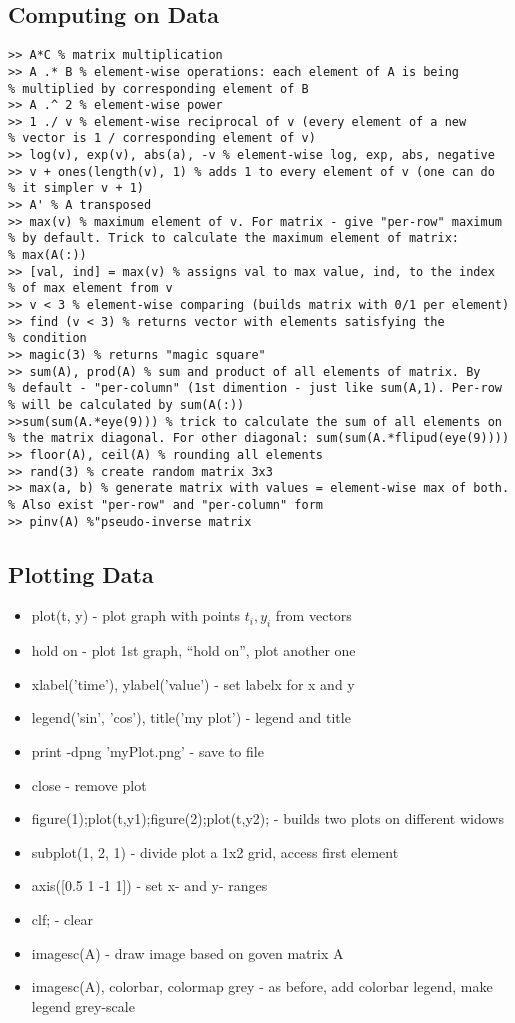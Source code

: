 \documentclass{scrartcl}
\begin{document}
\subsection{Computing on Data}
\label{5-3}
\begin{verbatim}
>> A*C % matrix multiplication
>> A .* B % element-wise operations: each element of A is being
% multiplied by corresponding element of B
>> A .^ 2 % element-wise power
>> 1 ./ v % element-wise reciprocal of v (every element of a new
% vector is 1 / corresponding element of v)
>> log(v), exp(v), abs(a), -v % element-wise log, exp, abs, negative
>> v + ones(length(v), 1) % adds 1 to every element of v (one can do
% it simpler v + 1)
>> A' % A transposed
>> max(v) % maximum element of v. For matrix - give "per-row" maximum
% by default. Trick to calculate the maximum element of matrix:
% max(A(:))
>> [val, ind] = max(v) % assigns val to max value, ind, to the index
% of max element from v
>> v < 3 % element-wise comparing (builds matrix with 0/1 per element)
>> find (v < 3) % returns vector with elements satisfying the
% condition
>> magic(3) % returns "magic square"
>> sum(A), prod(A) % sum and product of all elements of matrix. By
% default - "per-column" (1st dimention - just like sum(A,1). Per-row
% will be calculated by sum(A(:))
>>sum(sum(A.*eye(9))) % trick to calculate the sum of all elements on
% the matrix diagonal. For other diagonal: sum(sum(A.*flipud(eye(9))))
>> floor(A), ceil(A) % rounding all elements
>> rand(3) % create random matrix 3x3
>> max(a, b) % generate matrix with values = element-wise max of both.
% Also exist "per-row" and "per-column" form
>> pinv(A) %"pseudo-inverse matrix 
\end{verbatim}

\subsection{Plotting Data}
\label{5-4}
\begin{itemize}
\item{plot(t, y)} - plot graph with points $t_i, y_i$ from vectors
\item{hold on} - plot 1st graph, ``hold on'', plot another one
\item{xlabel('time'), ylabel('value')} - set labelx for x and y
\item{legend('sin', 'cos'), title('my plot')} - legend and title
\item{print -dpng 'myPlot.png'} - save to file
\item{close} - remove plot
\item{figure(1);plot(t,y1);figure(2);plot(t,y2);} - builds two plots
  on different widows
\item{subplot(1, 2, 1)} - divide plot a 1x2 grid, access first element
\item{axis([0.5 1 -1 1])} - set x- and y- ranges
\item{clf;} - clear
\item{imagesc(A)} - draw image based on goven matrix A
\item{imagesc(A), colorbar, colormap grey} - as before, add colorbar
  legend, make legend grey-scale
\end{itemize}
\end{document}
